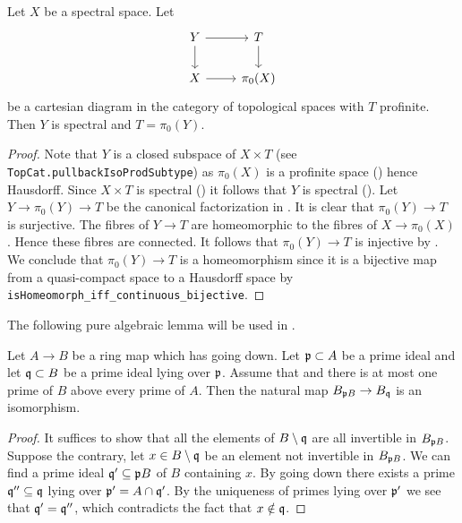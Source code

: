 \begin{lemma}
Let $X$ be a spectral space. Let
\[
\begin{tikzcd}
Y \arrow[r] \arrow[d] & T \arrow[d] \\
X \arrow[r] & \pi_0(X)
\end{tikzcd}
\]
be a cartesian diagram in the category of topological spaces with $T$ profinite. Then $Y$ is spectral and $T = \pi_0(Y)$.
\label{thm:cartesian-profinite}
\end{lemma}

\begin{proof}
  Note that $Y$ is a closed subspace of $X \times T$ (see \verb`TopCat.pullbackIsoProdSubtype`) as $\pi_0(X)$ is a profinite space () hence Hausdorff. Since $X \times T$ is spectral () it follows that $Y$ is spectral (). Let $Y \to \pi_0(Y) \to T$ be the canonical factorization in . It is clear that $\pi_0(Y) \to T$ is surjective. The fibres of $Y \to T$ are homeomorphic to the fibres of $X \to \pi_0(X)$. Hence these fibres are connected. It follows that $\pi_0(Y) \to T$ is injective by . We conclude that $\pi_0(Y) \to T$ is a homeomorphism since it is a bijective map from a quasi-compact space to a Hausdorff space by \verb`isHomeomorph_iff_continuous_bijective`.
\end{proof}

The following pure algebraic lemma will be used in .

\begin{lemma}
  \label{thm:localization-isom-of-going-down}
  Let $A \to B$ be a ring map which has going down. Let ${\mathfrak{p}} \subset A$ be a prime ideal and let ${\mathfrak{q}} \subset B$ be a prime ideal lying over ${\mathfrak{p}}$. Assume that and there is at most one prime of $B$ above every prime of $A$. Then the natural map $B_{{\mathfrak{p}} B} \to B_{{\mathfrak{q}}}$ is an isomorphism.
\end{lemma}

\begin{proof}
  It suffices to show that all the elements of $B \setminus {\mathfrak{q}}$ are all invertible in $B_{{\mathfrak{p}} B}$. Suppose the contrary, let $x \in B \setminus {\mathfrak{q}}$ be an element not invertible in $B_{{\mathfrak{p}} B}$. We can find a prime ideal ${\mathfrak{q}}' \subseteq {\mathfrak{p}} B$ of $B$ containing $x$. By going down there exists a prime ${\mathfrak{q}}'' \subseteq {\mathfrak{q}}$ lying over ${\mathfrak{p}}' = A \cap {\mathfrak{q}}'$. By the uniqueness of primes lying over ${\mathfrak{p}}'$ we see that ${\mathfrak{q}}' = {\mathfrak{q}}''$, which contradicts the fact that $x \notin {\mathfrak{q}}$.
\end{proof}

